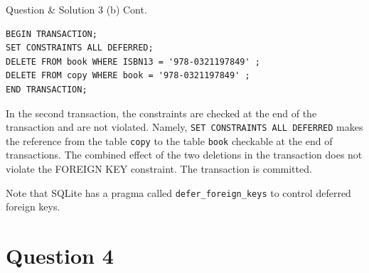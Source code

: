 \begin{frame}[fragile]{Question \& Solution 3 (b) Cont.}

\begin{lstlisting}
BEGIN TRANSACTION;
SET CONSTRAINTS ALL DEFERRED;
DELETE FROM book WHERE ISBN13 = '978-0321197849' ;
DELETE FROM copy WHERE book = '978-0321197849' ;
END TRANSACTION;
\end{lstlisting}

In the second transaction, the constraints are checked at the end of the transaction and are not violated.  Namely, \texttt{SET CONSTRAINTS ALL DEFERRED} makes the reference from the table \texttt{copy} to the table \texttt{book} checkable at the end of transactions. The combined effect of the two deletions in the transaction does not violate the FOREIGN KEY constraint. The transaction is committed. \vspace{10pt}

Note that SQLite has a pragma called \texttt{defer\_foreign\_keys} to control deferred foreign keys.
\end{frame}

\section*{Question 4}

